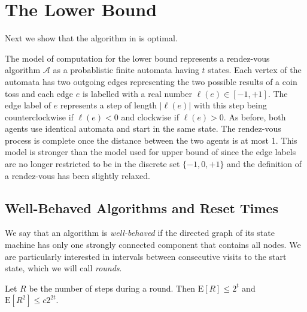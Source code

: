 \documentclass[lotsofwhite]{patmorin}
\newcommand{\E}{\mathrm{E}}
\newcommand{\A}{\mathcal{A}}
\begin{document}
\section{The Lower Bound}

Next we show that the algorithm in  is
optimal.

The model of computation for the lower bound represents a rendez-vous
algorithm $\A$ as a probablistic finite automata having $t$ states.
Each vertex of the automata has two outgoing edges representing the
two possible results of a coin toss and each edge $e$ is labelled with
a real number $\ell(e)\in[-1,+1]$.  The edge label of $e$ represents a
step of length $|\ell(e)|$ with this step being counterclockwise if
$\ell(e)<0$ and clockwise if $\ell(e)>0$.  As before, both agents use
identical automata and start in the same state.  The rendez-vous
process is complete once the distance between the two agents is at
most 1.  This model is stronger than the model used for upper bound of
 since the edge labels are no longer restricted to
be in the discrete set $\{-1,0,+1\}$ and the definition of a
rendez-vous has been slightly relaxed.

\subsection{Well-Behaved Algorithms and Reset Times}

We say that an algorithm is \emph{well-behaved} if the directed graph
of its state machine has only one strongly connected component that
contains all nodes.  We are particularly interested in intervals
between consecutive visits to the start state, which we will call
\emph{rounds}.

\begin{lem}
Let $R$ be the number of steps during a round. Then 
$\E[R] \le 2^t$ and $\E[R^2] \le c2^{2t}$.
\end{lem}
\end{document}
